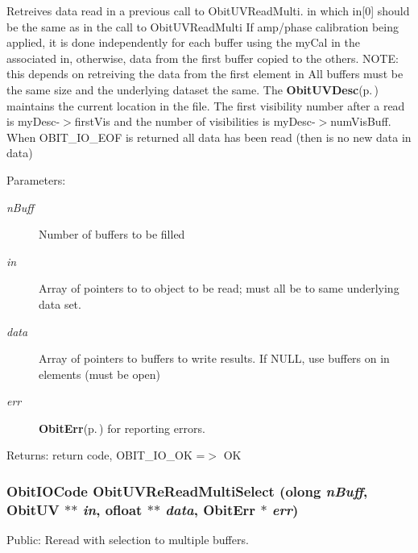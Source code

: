 Retreives data read in a previous call to Obit\-UVRead\-Multi. in which in[0] should be the same as in the call to Obit\-UVRead\-Multi If amp/phase calibration being applied, it is done independently for each buffer using the my\-Cal in the associated in, otherwise, data from the first buffer copied to the others. NOTE: this depends on retreiving the data from the first element in All buffers must be the same size and the underlying dataset the same. The {\bf Obit\-UVDesc}{\rm (p.\,\pageref{structObitUVDesc})} maintains the current location in the file. The first visibility number after a read is my\-Desc-$>$first\-Vis and the number of visibilities is my\-Desc-$>$num\-Vis\-Buff. When OBIT\_\-IO\_\-EOF is returned all data has been read (then is no new data in data) \begin{Desc}
\item[Parameters:]
\begin{description}
\item[{\em n\-Buff}]Number of buffers to be filled \item[{\em in}]Array of pointers to to object to be read; must all be to same underlying data set. \item[{\em data}]Array of pointers to buffers to write results. If NULL, use buffers on in elements (must be open) \item[{\em err}]{\bf Obit\-Err}{\rm (p.\,\pageref{structObitErr})} for reporting errors. \end{description}
\end{Desc}
\begin{Desc}
\item[Returns:]return code, OBIT\_\-IO\_\-OK =$>$ OK \end{Desc}
\subsubsection{\setlength{\rightskip}{0pt plus 5cm}Obit\-IOCode Obit\-UVRe\-Read\-Multi\-Select ({\bf olong} {\em n\-Buff}, {\bf Obit\-UV} $\ast$$\ast$ {\em in}, {\bf ofloat} $\ast$$\ast$ {\em data}, {\bf Obit\-Err} $\ast$ {\em err})}\label{ObitUV_8h_a42}


Public: Reread with selection to multiple buffers. 


